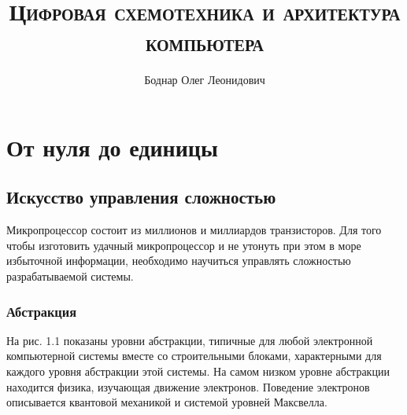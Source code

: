 

\setmainfont{Times New Roman}

\title{\textbf{\textsc{Цифровая схемотехника и архитектура компьютера}}}
\author{Боднар Олег Леонидович}
\date{} %
\linespread{1.3} %

\hypersetup{hidelinks} %

\pagestyle{fancy} %
\fancyhf{}
\rhead{\thepage} %
\renewcommand{\headrulewidth}{1pt} %


	
	\maketitle %
	\thispagestyle{empty} %
	\clearpage %
	\setcounter{page}{1} %
	\thispagestyle{empty}
	
	\renewcommand{\contentsname}{Содержание} %
	\tableofcontents\label{sec:toc}
	\clearpage
	
	\section{От нуля до единицы}
	
	\subsection{Искусство управления сложностью}
	
	\par Микропроцессор состоит из миллионов и миллиардов транзисторов. Для того чтобы изготовить удачный микропроцессор и не утонуть при этом в море избыточной информации, необходимо научиться управлять сложностью разрабатываемой системы.
    
    \subsubsection{Абстракция}
    
    \par На рис. 1.1 показаны уровни абстракции, типичные для любой электронной компьютерной системы вместе со строительными блоками, характерными для каждого уровня абстракции этой системы. На самом низком уровне абстракции находится физика, изучающая движение электронов. Поведение электронов описывается квантовой механикой и системой уровней Максвелла.
	
